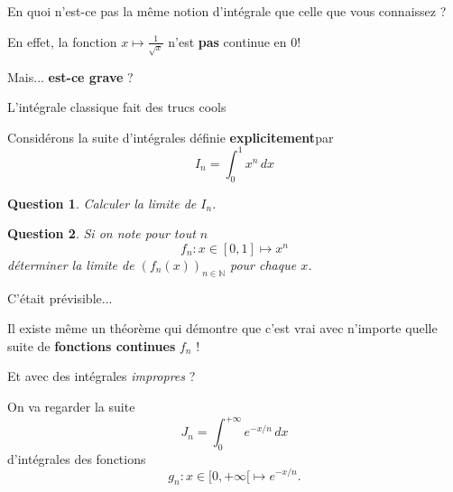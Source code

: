 \documentclass{beamer}
\newcommand{\NN}{\mathbb N}
\theoremstyle{plain}
\newtheorem{ques}{Question}
\begin{document}
\begin{frame}
En quoi n'est-ce pas la même notion d'intégrale que celle que vous connaissez ?\pause

En effet, la fonction $x\longmapsto \frac{1}{\sqrt x}$ n'est \textbf{pas} continue en 0!

Mais... \textbf{est-ce grave} ?
\end{frame}

\begin{frame}{L'intégrale classique fait des trucs cools}

Considérons la suite d'intégrales définie \textbf{explicitement}\footnotemark par
\[
	I_n = \int_0^1 x^n\,dx
\]\pause

\begin{ques}
Calculer la limite de $I_n$.
\end{ques}


\end{frame}

\begin{frame}

\begin{ques}
	Si on note pour tout $n$ 
	\[
	f_n\colon x\in[0,1] \longmapsto x^n
	\]
	déterminer la limite de $\left(f_n(x)\right)_{n\in\NN}$ pour chaque $x$.
\end{ques}

\end{frame}


\begin{frame}
C'était prévisible...\pause

Il existe même un théorème qui démontre que c'est vrai avec n'importe quelle suite de \textbf{fonctions continues} $f_n$ !\footnotemark 

\end{frame}

\begin{frame}{Et avec des intégrales \textit{impropres} ?}

On va regarder la suite
\[
J_n = \int_0^{+\infty} e^{-x/n}\, dx
\]
d'intégrales des fonctions
\[
	g_n\colon x\in {[0,+\infty[} \longmapsto e^{-x/n}.
\]


\end{frame}
\end{document}
